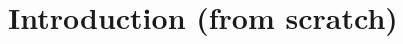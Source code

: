 \documentclass{elsarticle}
\newtheorem{theorem}{Theorem}[section]
\theoremstyle{definition}
\theoremstyle{remark}
\numberwithin{equation}{subsection}
\DeclareMathOperator{\sch}{\mathfrak{S}}
\newcommand{\tom}[1]{\xrightarrow{#1}}
\begin{document}


\newcommand{\dsch}{\ensuremath{\Xi}}
\newcommand{\coma}{\mathcal{A}}
\newcommand{\dcoma}{\mathcal{D}}



\section{Introduction (from scratch)}
\end{document}
